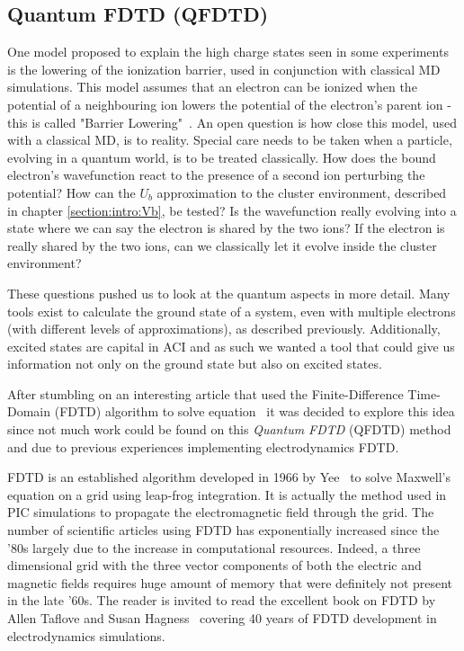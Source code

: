 \subsection{Quantum FDTD (QFDTD)}
\label{section:tools:qfdtd}


One model proposed to explain the high charge states seen in some experiments
is the lowering of the ionization barrier, used in conjunction with classical
MD simulations. This model assumes that an electron can be ionized when
the potential of a neighbouring ion lowers the potential of the electron's
parent ion - this is called "Barrier Lowering"~\cite{Georgescu2007,Fennel2010}.
An open question is how close this model, used
with a classical MD, is to reality. Special care needs to be taken when a
particle, evolving in a quantum world, is to be treated classically.
How does
the bound electron's wavefunction react to the presence of a second ion
perturbing the potential? How can the $U_b$ approximation to the cluster
environment, described in chapter \ref{section:intro:Vb}, be tested?
Is the wavefunction really evolving into a state
where we can say the electron is shared by the two ions? If the electron is
really shared by the two ions, can we classically let it evolve inside the
cluster environment?

These questions pushed us to look at the quantum aspects in more detail. Many
tools exist to calculate the ground state of a system, even with
multiple electrons (with different levels of approximations),
as described previously. Additionally, excited states are
capital in ACI and as such we wanted a tool that could give us information not
only on the ground state but also on excited states.

After stumbling on an interesting article that used the Finite-Difference
Time-Domain (FDTD) algorithm to solve \schrodinger equation~\cite{Sudiarta2007}
it was decided to explore this idea since not much work could be found on this
\textit{Quantum FDTD} (QFDTD) method and due to previous experiences
implementing electrodynamics FDTD.

FDTD is an established algorithm developed in 1966 by Yee~\cite{Yee1966} to solve
Maxwell's equation on a grid using leap-frog integration.
It is actually the method used in PIC simulations to propagate the electromagnetic
field through the grid.
The number of
scientific articles using FDTD has exponentially increased since the '80s
largely due to the increase in computational resources. Indeed, a three
dimensional grid with the three vector components of both the electric and
magnetic fields requires huge amount of memory that were definitely not present
in the late '60s. The reader is invited to read the excellent book on FDTD by
Allen Taflove and Susan Hagness~\cite{Taflove2005} covering 40 years of FDTD
development in electrodynamics simulations.

